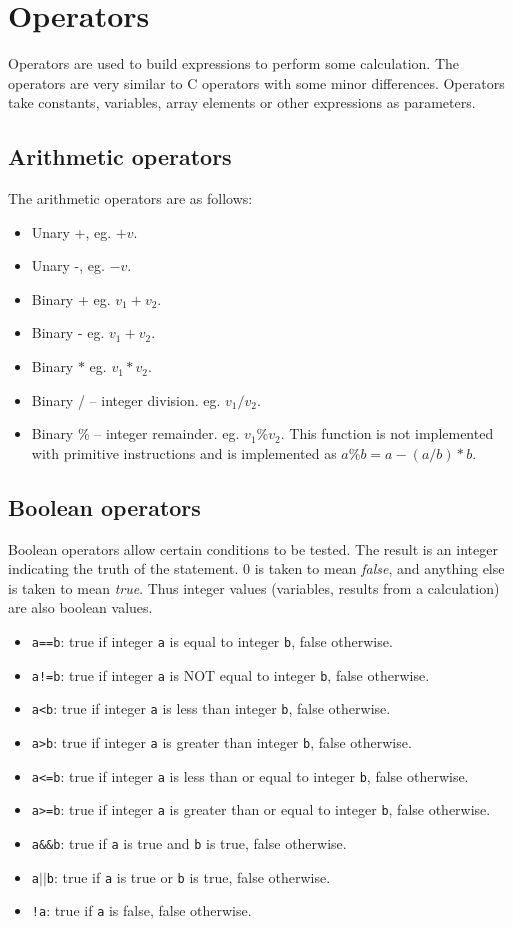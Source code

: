 \documentclass{article}
\def\pipe{$|$}
\begin{document}
\section{Operators}
Operators are used to build expressions 
to perform some calculation. The operators
are very similar to C operators with some
minor differences. Operators take constants,
variables, array elements or other expressions as parameters.
\subsection{Arithmetic operators}
The arithmetic operators are as follows:
\begin{itemize}
	\item Unary +, eg. $+v$.
	\item Unary -, eg. $-v$.
	\item Binary + eg. $v_1+v_2$.
	\item Binary - eg. $v_1+v_2$.
	\item Binary $\ast$ eg. $v_1\ast v_2$.
	\item Binary / -- integer division. eg. $v_1/v_2$.
	\item Binary \% -- integer remainder. eg. $v_1\%v_2$.
		This function is not implemented with
		primitive instructions and is implemented as
		$a\%b=a-(a/b)\ast b$.
\end{itemize}

\subsection{Boolean operators}
Boolean operators allow certain conditions to be tested.
The result is an integer indicating the truth of the
statement. 0 is taken to mean {\it false}, and anything
else is taken to mean {\it true}. Thus integer values (variables,
results from a calculation) are also boolean values.
\begin{itemize}
	\item {\tt a==b}: true if integer {\tt a} is equal to integer {\tt b}, false otherwise.
	\item {\tt a!=b}: true if integer {\tt a} is NOT equal to integer {\tt b}, false otherwise.
	\item {\tt a<b}: true if integer {\tt a} is less than integer {\tt b}, false otherwise.
	\item {\tt a>b}: true if integer {\tt a} is greater than integer {\tt b}, false otherwise.
	\item {\tt a<=b}: true if integer {\tt a} is less than or equal to integer {\tt b}, false otherwise.
	\item {\tt a>=b}: true if integer {\tt a} is greater than or equal to integer {\tt b}, false otherwise.
	\item {\tt a\&\&b}: true if {\tt a} is true and {\tt b} is true, false otherwise.
	\item {\tt a\pipe\pipe b}: true if {\tt a} is true or {\tt b} is true, false otherwise.
	\item {\tt !a}: true if {\tt a} is false, false otherwise.
\end{itemize}
\end{document}

